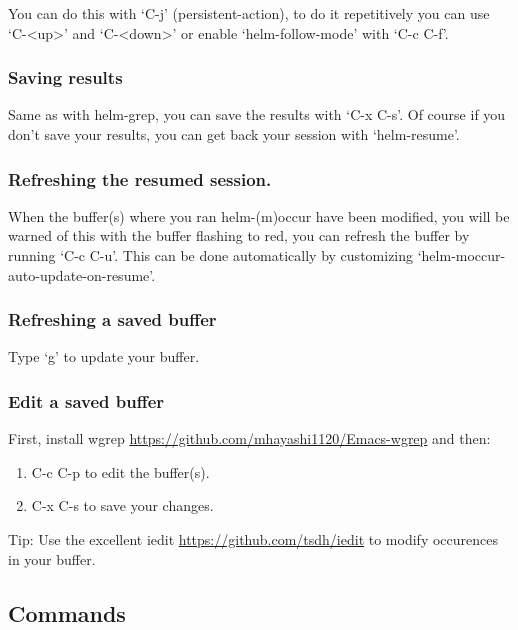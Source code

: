 \documentclass[11pt]{article}
\begin{document}
You can do this with ‘C-j’ (persistent-action), to do it repetitively
you can use ‘C-<up>’ and ‘C-<down>’ or enable ‘helm-follow-mode’ with ‘C-c C-f’.

\subsubsection{Saving results}
\label{sec:orgb21b816}

Same as with helm-grep, you can save the results with ‘C-x C-s’.
Of course if you don’t save your results, you can get back your session
with ‘helm-resume’.

\subsubsection{Refreshing the resumed session.}
\label{sec:org82aa6b9}

When the buffer(s) where you ran helm-(m)occur have been modified, you will be
warned of this with the buffer flashing to red, you can refresh the buffer by running
‘C-c C-u’.
This can be done automatically by customizing ‘helm-moccur-auto-update-on-resume’.

\subsubsection{Refreshing a saved buffer}
\label{sec:org9991f8c}

Type ‘g’ to update your buffer.

\subsubsection{Edit a saved buffer}
\label{sec:org58425a8}

First, install wgrep \url{https://github.com/mhayashi1120/Emacs-wgrep}
and then:

\begin{enumerate}
\item C-c C-p to edit the buffer(s).
\item C-x C-s to save your changes.
\end{enumerate}

Tip: Use the excellent iedit \url{https://github.com/tsdh/iedit}
to modify occurences in your buffer.

\subsection{Commands}
\label{sec:orgf52383e}
\end{document}
